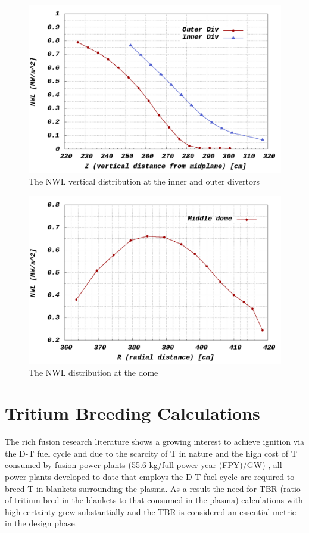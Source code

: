\documentclass[12pt, letterpaper]{elsarticle}
\begin{document}
\begin{figure}[h!]
  \centering
  \includegraphics[scale=0.3]{../plots/NWL_2divs.png}
  \caption{The NWL vertical distribution at the inner and outer divertors}
  \label{fig:NWL 2Divs}
\end{figure}
\begin{figure}[h!]
	\centering
	\includegraphics[scale=0.3]{../plots/NWL_div.png}
	\caption{The NWL distribution at the dome}
	\label{fig:NWL Dome}
\end{figure}

\section{Tritium Breeding Calculations} \label{Tritium Breeding Calculations}
The rich fusion research literature shows a growing interest to achieve ignition via the D-T fuel cycle and due to the scarcity of T in nature and the high cost of T consumed by fusion power plants (55.6 kg/full power year (FPY)/GW) \cite{ref_4}, all power plants developed to date that employs the D-T fuel cycle are required to breed T in blankets surrounding the plasma. As a result the need for TBR (ratio of tritium bred in the blankets to that consumed in the plasma) calculations with high certainty grew substantially and the TBR is considered an essential metric in the design phase.\vspace{5mm}
\end{document}
